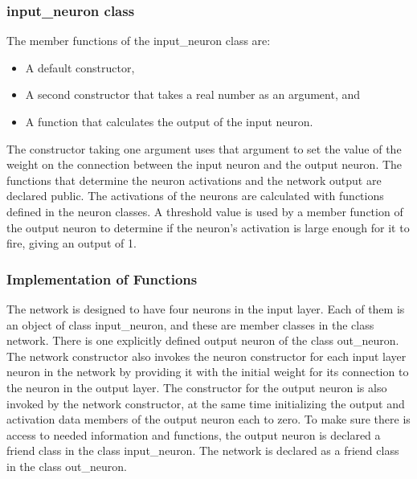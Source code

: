 \subsubsection{input\_neuron class}
The member functions of the input\_neuron class are: 
\begin{itemize}
\item A default constructor, 
\item A second constructor that takes a real number as an argument, and 
\item A function that calculates the output of the input neuron. \\
\end{itemize}


The constructor taking one argument uses that argument to set the value of the weight on the connection between the input neuron and the output neuron. The functions that determine the neuron activations and the network output are declared public. The activations of the neurons are calculated with functions defined in the neuron classes. A threshold value is used by a member function of the output neuron to determine if the neuron’s activation is
large enough for it to fire, giving an output of 1.

\subsubsection{Implementation of Functions}


The network is designed to have four neurons in the input layer. Each of them is an object of class input\_neuron, and these are member classes in the class network. There is one explicitly defined output neuron of the class out\_neuron. The network constructor also invokes the neuron constructor for each input layer neuron in the network by providing it with the initial weight for its connection to the neuron in the output layer. The constructor for the output neuron is also invoked by the network constructor, at the same time initializing the output and activation data members of the output neuron each to zero. To make sure there is access to needed information and functions, the output neuron is declared a friend class in the class input\_neuron. The network is declared as a friend class in the class out\_neuron.

